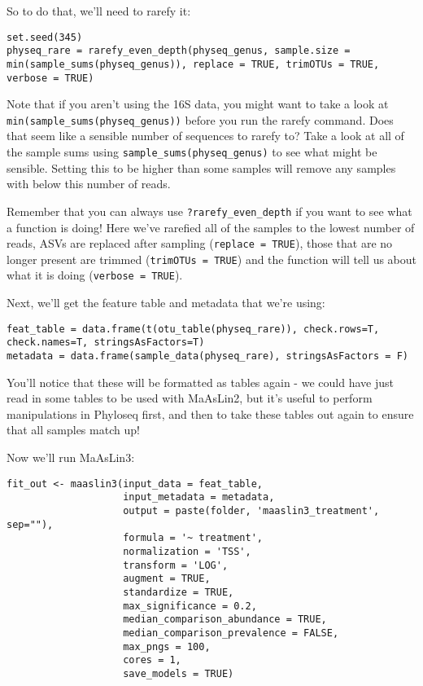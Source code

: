 \documentclass[
]{book}
\begin{document}
So to do that, we'll need to rarefy it:

\begin{verbatim}
set.seed(345)
physeq_rare = rarefy_even_depth(physeq_genus, sample.size = min(sample_sums(physeq_genus)), replace = TRUE, trimOTUs = TRUE, verbose = TRUE)
\end{verbatim}

Note that if you aren't using the 16S data, you might want to take a look at \texttt{min(sample\_sums(physeq\_genus))} before you run the rarefy command. Does that seem like a sensible number of sequences to rarefy to? Take a look at all of the sample sums using \texttt{sample\_sums(physeq\_genus)} to see what might be sensible. Setting this to be higher than some samples will remove any samples with below this number of reads.

Remember that you can always use \texttt{?rarefy\_even\_depth} if you want to see what a function is doing!
Here we've rarefied all of the samples to the lowest number of reads, ASVs are replaced after sampling (\texttt{replace\ =\ TRUE}), those that are no longer present are trimmed (\texttt{trimOTUs\ =\ TRUE}) and the function will tell us about what it is doing (\texttt{verbose\ =\ TRUE}).

Next, we'll get the feature table and metadata that we're using:

\begin{verbatim}
feat_table = data.frame(t(otu_table(physeq_rare)), check.rows=T, check.names=T, stringsAsFactors=T)
metadata = data.frame(sample_data(physeq_rare), stringsAsFactors = F)
\end{verbatim}

You'll notice that these will be formatted as tables again - we could have just read in some tables to be used with MaAsLin2, but it's useful to perform manipulations in Phyloseq first, and then to take these tables out again to ensure that all samples match up!

Now we'll run MaAsLin3:

\begin{verbatim}
fit_out <- maaslin3(input_data = feat_table,
                    input_metadata = metadata,
                    output = paste(folder, 'maaslin3_treatment', sep=""),
                    formula = '~ treatment',
                    normalization = 'TSS',
                    transform = 'LOG',
                    augment = TRUE,
                    standardize = TRUE,
                    max_significance = 0.2,
                    median_comparison_abundance = TRUE,
                    median_comparison_prevalence = FALSE,
                    max_pngs = 100,
                    cores = 1,
                    save_models = TRUE)
\end{verbatim}
\end{document}
